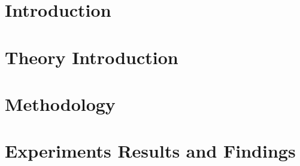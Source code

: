 \chapter{Introduction}\label{ch:introduction}


\chapter{Theory Introduction}\label{ch:first_chapter}


\chapter{Methodology}\label{ch:second_chapter}


\chapter{Experiments Results and Findings}\label{ch:experiments}


%
%
%
